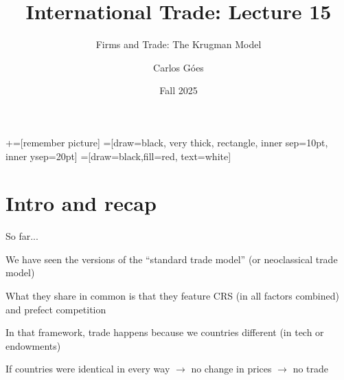 \documentclass[notes,11pt, aspectratio=169, xcolor=table]{beamer}
\title[]{International Trade: Lecture 15}
\subtitle[]{Firms and Trade: The Krugman Model}
\author[Góes]
{Carlos Góes\inst{1}}
\date{Fall 2025}
\institute[GWU]{\inst{1} George Washington University }
\newenvironment{wideitemize}{\itemize\addtolength{\itemsep}{10pt}}{\enditemize}
\begin{document}
\newcommand\marktopleft[1]{%
    \tikz[overlay,remember picture] 
        \node (marker-#1-a) at (-.3em,.3em) {};%
}
\newcommand\markbottomright[2]{%
    \tikz[overlay,remember picture] 
        \node (marker-#1-b) at (0em,0em) {};%
}
+=[remember picture] 
 =[draw=black, very thick, rectangle, inner sep=10pt, inner ysep=20pt]
 =[draw=black,fill=red, text=white]















\frame{\titlepage}
\addtocounter{framenumber}{-1}

\section{Intro and recap}

\begin{frame}{So far...}
\begin{wideitemize}
    \item We have seen the versions of the ``standard trade model'' (or neoclassical trade model)
    \item What they share in common is that they feature CRS (in all factors combined) and prefect competition
    \item In that framework, trade happens because we countries different (in tech or endowments)
    \item If countries were identical in every way $\rightarrow$ no change in prices $\rightarrow$ no trade
\end{wideitemize}
\end{frame}
\end{document}
